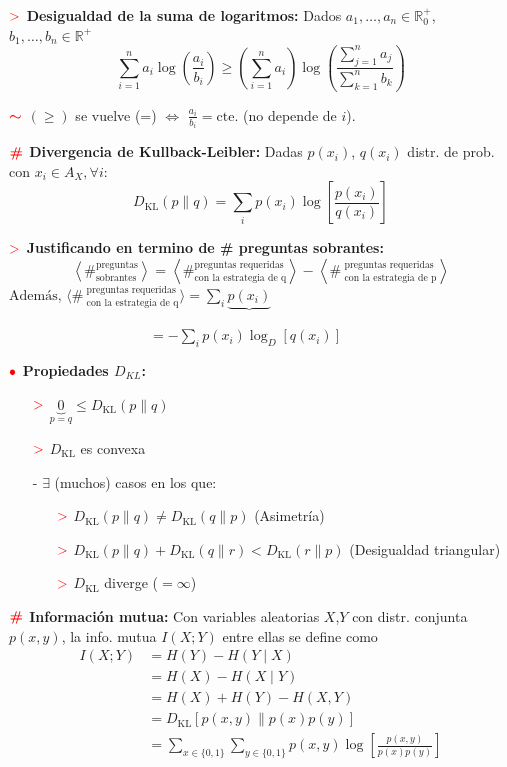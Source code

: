 \documentclass[%
 reprint,
 amsmath,amssymb,
 aps,
]{revtex4-1}
\begin{document}
\textbf{$\textcolor{red}{\mathbf{>}}$ Desigualdad de la suma de logaritmos:} Dados $a_{1}, \ldots, a_{n} \in \mathbb{R}^+_0$, $b_{1}, \ldots, b_{n} \in \mathbb{R}^+$
$$
\sum_{i=1}^{n} a_{i} \log \left(\frac{a_{i}}{b_{i}}\right) \geq\left(\sum_{i=1}^{n} a_{i}\right) \log \left(\frac{\sum_{j=1}^{n} a_{j}}{\sum_{k=1}^{n} b_{k}}\right)
$$

\textbf{$\textcolor{red}{\color{red}{\boldsymbol{\sim}}}$} 
$(\geq)$ se vuelve (=) $\Leftrightarrow$ $\frac{a_{i}}{b_{i}} = \text{cte.}$ (no depende de $i$).

\textbf{$\color{red}{\textbf{\#}}$ Divergencia de Kullback-Leibler:}
Dadas $p\left(x_{i}\right)$, $q\left(x_{i}\right)$ distr. de prob. con $x_i \in A_X, \forall i$:
$$
D_{\mathrm{KL}}(p \| q)=\sum_{i} p\left(x_{i}\right) \log \left[\frac{p\left(x_{i}\right)}{q\left(x_{i}\right)}\right]
$$

\textbf{$\textcolor{red}{\mathbf{>}}$ Justificando en termino de \# preguntas sobrantes:}
$$
\left\langle
\#
^\text {preguntas} _\text{sobrantes}
\right\rangle
=
\left\langle
\#
^\text {preguntas requeridas}
_\text {con la estrategia de q}
\right\rangle
-
\left\langle
\# 
^\text { preguntas requeridas }
_\text { con la estrategia de p}
\right\rangle
$$
$ \text{Además, }
\langle
\# 
^\text { preguntas requeridas }
_\text { con la estrategia de q}
\rangle 
=
\sum_{i} \underbrace{p\left(x_{i}\right)}$

$\qquad \qquad \qquad \qquad \qquad =-\sum_{i} p\left(x_{i}\right) \log _{D}\left[q\left(x_{i}\right)\right]$

\textbf{$\color{red}{\bullet}$ Propiedades $D_{KL}$: }

\begin{enumerate}
  \item[$\textcolor{red}{\mathbf{>}}$] $\underbrace{0}_{p=q} \leq D_{\mathrm{KL}}(p \| q)$
  \item[$\textcolor{red}{\mathbf{>}}$] $D_{\mathrm{KL}}$ es convexa

  \item[-] $\exists$ (muchos) casos en los que:
  \begin{itemize}
    \item[$\textcolor{red}{\mathbf{>}}$] $D_{\mathrm{KL}}(p \| q) \neq D_{\mathrm{KL}}(q \| p)$ (Asimetría) 
    \item[$\textcolor{red}{\mathbf{>}}$] $D_{\mathrm{KL}}(p \| q)+D_{\mathrm{KL}}(q \| r)<D_{\mathrm{KL}}(r \| p)$ (Desigualdad triangular)
    \item[$\textcolor{red}{\mathbf{>}}$] $D_{\mathrm{KL}}$ diverge ($=\infty$)
  \end{itemize}
\end{enumerate}

\textbf{$\color{red}{\textbf{\#}}$ Información mutua:} 
Con variables aleatorias $X$,$Y$ con distr. conjunta $p(x, y)$, la info.
mutua $I(X ; Y)$ entre ellas se define como
$$
\begin{aligned}
I(X ; Y) &=H(Y)-H(Y \mid X) \\
&=H(X)-H(X \mid Y) \\
&=H(X)+H(Y)-H(X, Y) \\
&=D_{\mathrm{KL}}[p(x, y) \| p(x) p(y)] \\
&=\sum_{x \in\{0,1\}} \sum_{y \in\{0,1\}} p(x, y) \log \left[\frac{p(x, y)}{p(x) p(y)}\right]
\end{aligned}
$$
\end{document}
